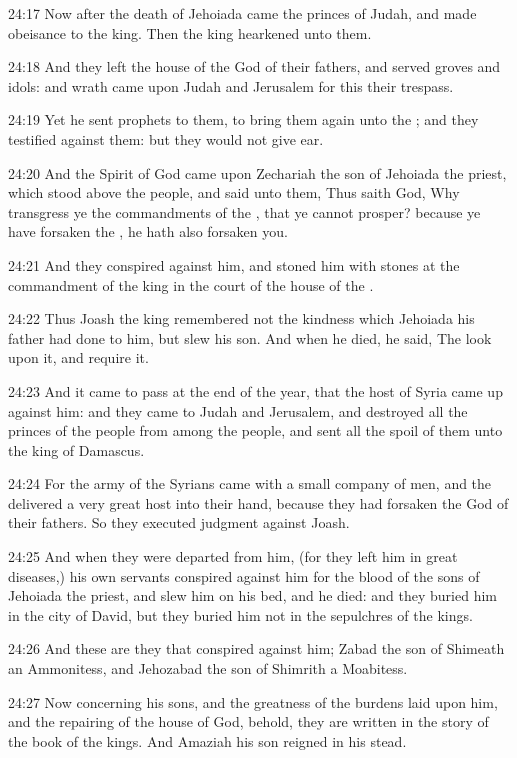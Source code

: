 24:17 Now after the death of Jehoiada came the princes of Judah, and
made obeisance to the king. Then the king hearkened unto them.

24:18 And they left the house of the \LORD God of their fathers, and
served groves and idols: and wrath came upon Judah and Jerusalem for
this their trespass.

24:19 Yet he sent prophets to them, to bring them again unto the \LORD;
and they testified against them: but they would not give ear.

24:20 And the Spirit of God came upon Zechariah the son of Jehoiada
the priest, which stood above the people, and said unto them, Thus
saith God, Why transgress ye the commandments of the \LORD, that ye
cannot prosper? because ye have forsaken the \LORD, he hath also
forsaken you.

24:21 And they conspired against him, and stoned him with stones at
the commandment of the king in the court of the house of the \LORD.

24:22 Thus Joash the king remembered not the kindness which Jehoiada
his father had done to him, but slew his son. And when he died, he
said, The \LORD look upon it, and require it.

24:23 And it came to pass at the end of the year, that the host of
Syria came up against him: and they came to Judah and Jerusalem, and
destroyed all the princes of the people from among the people, and
sent all the spoil of them unto the king of Damascus.

24:24 For the army of the Syrians came with a small company of men,
and the \LORD delivered a very great host into their hand, because they
had forsaken the \LORD God of their fathers. So they executed judgment
against Joash.

24:25 And when they were departed from him, (for they left him in
great diseases,) his own servants conspired against him for the blood
of the sons of Jehoiada the priest, and slew him on his bed, and he
died: and they buried him in the city of David, but they buried him
not in the sepulchres of the kings.

24:26 And these are they that conspired against him; Zabad the son of
Shimeath an Ammonitess, and Jehozabad the son of Shimrith a Moabitess.

24:27 Now concerning his sons, and the greatness of the burdens laid
upon him, and the repairing of the house of God, behold, they are
written in the story of the book of the kings. And Amaziah his son
reigned in his stead.

